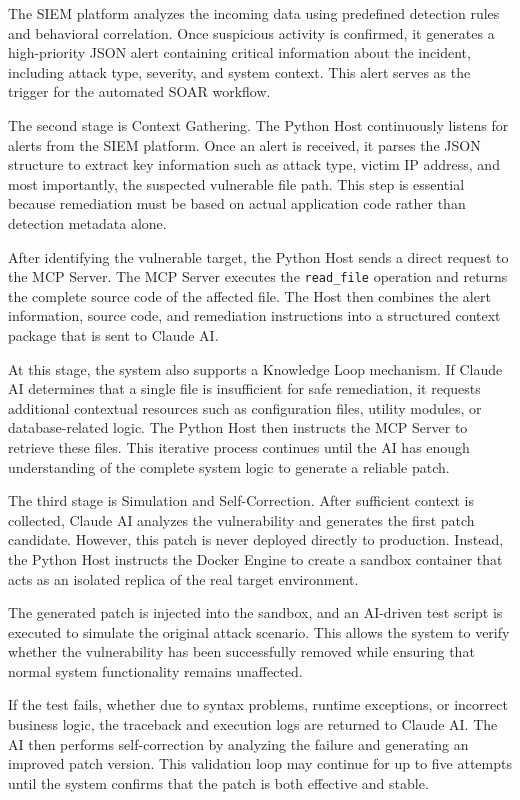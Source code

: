 \documentclass[12pt]{report}
\begin{document}
The SIEM platform analyzes the incoming data using predefined detection rules and behavioral correlation. Once suspicious activity is confirmed, it generates a high-priority JSON alert containing critical information about the incident, including attack type, severity, and system context. This alert serves as the trigger for the automated SOAR workflow.

The second stage is Context Gathering. The Python Host continuously listens for alerts from the SIEM platform. Once an alert is received, it parses the JSON structure to extract key information such as attack type, victim IP address, and most importantly, the suspected vulnerable file path. This step is essential because remediation must be based on actual application code rather than detection metadata alone.

After identifying the vulnerable target, the Python Host sends a direct request to the MCP Server. The MCP Server executes the \texttt{read\_file} operation and returns the complete source code of the affected file. The Host then combines the alert information, source code, and remediation instructions into a structured context package that is sent to Claude AI.

At this stage, the system also supports a Knowledge Loop mechanism. If Claude AI determines that a single file is insufficient for safe remediation, it requests additional contextual resources such as configuration files, utility modules, or database-related logic. The Python Host then instructs the MCP Server to retrieve these files. This iterative process continues until the AI has enough understanding of the complete system logic to generate a reliable patch.

The third stage is Simulation and Self-Correction. After sufficient context is collected, Claude AI analyzes the vulnerability and generates the first patch candidate. However, this patch is never deployed directly to production. Instead, the Python Host instructs the Docker Engine to create a sandbox container that acts as an isolated replica of the real target environment.

The generated patch is injected into the sandbox, and an AI-driven test script is executed to simulate the original attack scenario. This allows the system to verify whether the vulnerability has been successfully removed while ensuring that normal system functionality remains unaffected.

If the test fails, whether due to syntax problems, runtime exceptions, or incorrect business logic, the traceback and execution logs are returned to Claude AI. The AI then performs self-correction by analyzing the failure and generating an improved patch version. This validation loop may continue for up to five attempts until the system confirms that the patch is both effective and stable.
\end{document}
